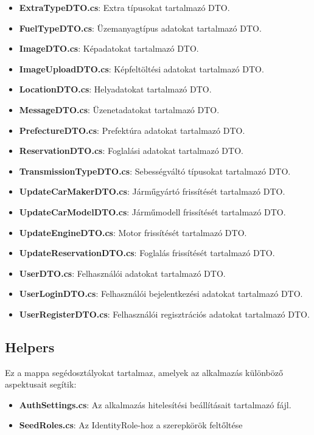 \documentclass{report}[11pt]
\begin{document}
\begin{itemize}
    \item \textbf{ExtraTypeDTO.cs}: Extra típusokat tartalmazó DTO.
    \item \textbf{FuelTypeDTO.cs}: Üzemanyagtípus adatokat tartalmazó DTO.
    \item \textbf{ImageDTO.cs}: Képadatokat tartalmazó DTO.
    \item \textbf{ImageUploadDTO.cs}: Képfeltöltési adatokat tartalmazó DTO.
    \item \textbf{LocationDTO.cs}: Helyadatokat tartalmazó DTO.
    \item \textbf{MessageDTO.cs}: Üzenetadatokat tartalmazó DTO.
    \item \textbf{PrefectureDTO.cs}: Prefektúra adatokat tartalmazó DTO.
    \item \textbf{ReservationDTO.cs}: Foglalási adatokat tartalmazó DTO.
    \item \textbf{TransmissionTypeDTO.cs}: Sebességváltó típusokat tartalmazó DTO.
    \item \textbf{UpdateCarMakerDTO.cs}: Járműgyártó frissítését tartalmazó DTO.
    \item \textbf{UpdateCarModelDTO.cs}: Járműmodell frissítését tartalmazó DTO.
    \item \textbf{UpdateEngineDTO.cs}: Motor frissítését tartalmazó DTO.
    \item \textbf{UpdateReservationDTO.cs}: Foglalás frissítését tartalmazó DTO.
    \item \textbf{UserDTO.cs}: Felhasználói adatokat tartalmazó DTO.
    \item \textbf{UserLoginDTO.cs}: Felhasználói bejelentkezési adatokat tartalmazó DTO.
    \item \textbf{UserRegisterDTO.cs}: Felhasználói regisztrációs adatokat tartalmazó DTO.
\end{itemize}

\subsection{Helpers}
Ez a mappa segédosztályokat tartalmaz, amelyek az alkalmazás különböző aspektusait segítik:

\begin{itemize}
    \item \textbf{AuthSettings.cs}: Az alkalmazás hitelesítési beállításait tartalmazó fájl.
    \item \textbf{SeedRoles.cs}: Az IdentityRole-hoz a szerepkörök feltőltése
\end{itemize}
\end{document}
